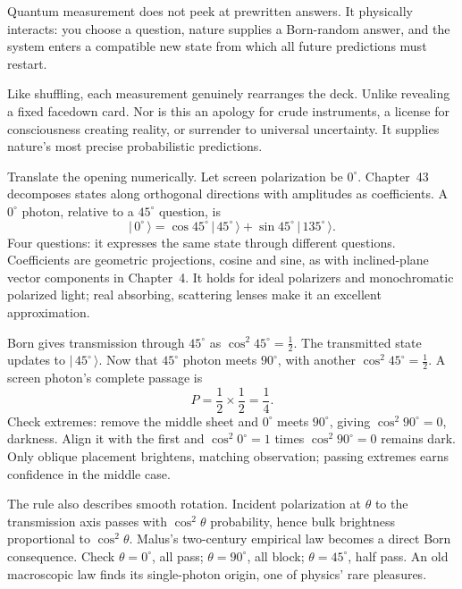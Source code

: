 
\begin{oneline}
Quantum measurement does not peek at prewritten answers. It physically interacts: you choose a question, nature supplies a Born-random answer, and the system enters a compatible new state from which all future predictions must restart.
\end{oneline}

Like shuffling, each measurement genuinely rearranges the deck. Unlike revealing a fixed facedown card. Nor is this an apology for crude instruments, a license for consciousness creating reality, or surrender to universal uncertainty. It supplies nature's most precise probabilistic predictions.


Translate the opening numerically. Let screen polarization be $0^\circ$. Chapter~43 decomposes states along orthogonal directions with amplitudes as coefficients. A $0^\circ$ photon, relative to a $45^\circ$ question, is
\[
|\,0^\circ\,\rangle=\cos 45^\circ\,|\,45^\circ\,\rangle+\sin 45^\circ\,|\,135^\circ\,\rangle .
\]
Four questions: it expresses the same state through different questions. Coefficients are geometric projections, cosine and sine, as with inclined-plane vector components in Chapter~4. It holds for ideal polarizers and monochromatic polarized light; real absorbing, scattering lenses make it an excellent approximation.

Born gives transmission through $45^\circ$ as $\cos^2 45^\circ=\tfrac12$. The transmitted state updates to $|\,45^\circ\,\rangle$. Now that $45^\circ$ photon meets $90^\circ$, with another $\cos^2 45^\circ=\tfrac12$. A screen photon's complete passage is
\[
P=\frac12\times\frac12=\frac14 .
\]
Check extremes: remove the middle sheet and $0^\circ$ meets $90^\circ$, giving $\cos^2 90^\circ=0$, darkness. Align it with the first and $\cos^2 0^\circ=1$ times $\cos^2 90^\circ=0$ remains dark. Only oblique placement brightens, matching observation; passing extremes earns confidence in the middle case.

The rule also describes smooth rotation. Incident polarization at $\theta$ to the transmission axis passes with $\cos^2\theta$ probability, hence bulk brightness proportional to $\cos^2\theta$. Malus's two-century empirical law becomes a direct Born consequence. Check $\theta=0^\circ$, all pass; $\theta=90^\circ$, all block; $\theta=45^\circ$, half pass. An old macroscopic law finds its single-photon origin, one of physics' rare pleasures.

